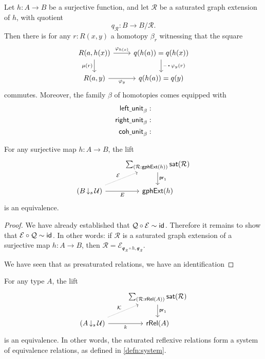 \begin{cor}
Let $h:A\to B$ be a surjective function, and let $\mathcal{R}$ be a saturated graph extension of $h$, with quotient
\begin{equation*}
q_{\mathcal{R}}:B\to B/\mathcal{R}.
\end{equation*}
Then there is for any $r:R(x,y)$ a homotopy $\beta_r$ witnessing that the square
\begin{equation*}
\begin{tikzcd}
R(a,h(x)) \arrow[d,swap,"\mu(r)"] \arrow[r,"\varphi_{h(x)}"] & q(h(a))=q(h(x)) \arrow[d,"\ct{\blank}{\varphi_y(r)}"] \\
R(a,y) \arrow[r,swap,"\varphi_y"] & q(h(a))=q(y)
\end{tikzcd}
\end{equation*}
commutes. Moreover, the family $\beta$ of homotopies comes equipped with
\begin{align*}
\mathsf{left\underline{\ }{}unit}_\beta & : \\
\mathsf{right\underline{\ }{}unit}_\beta & : \\
\mathsf{coh\underline{\ }{}unit}_\beta & : 
\end{align*}
\end{cor}

\begin{thm}
For any surjective map $h:A\to B$, the lift
\begin{equation*}
\begin{tikzcd}
& \sm{\mathcal{R}:\mathsf{gphExt}(h)}\mathsf{sat}(\mathcal{R}) \arrow[d,"\proj 1"] \\
(B\,{\downarrow_s}\,\UU) \arrow[r,swap,"E"] \arrow[ur,densely dotted,"\mathcal{E}"] & \mathsf{gphExt}(h)
\end{tikzcd}
\end{equation*}
is an equivalence.
\end{thm}

\begin{proof}
We have already established that $\mathcal{Q}\circ\mathcal{E}\sim \mathsf{id}_{}$. Therefore it remains to show that $\mathcal{E}\circ \mathcal{Q}\sim\mathsf{id}_{}$. In other words: if $\mathcal{R}$ is a saturated graph extension of a surjective map $h:A\to B$, then $\mathcal{R}=\mathcal{E}_{\mathcal{q}_{\mathcal{R}}\circ h,\mathcal{q}_{\mathcal{R}}}$. 

We have seen that as presaturated relations, we have an identification
\end{proof}

\begin{cor}
For any type $A$, the lift
\begin{equation*}
\begin{tikzcd}
& \sm{\mathcal{R}:\mathsf{rRel}(A)}\mathsf{sat}(\mathcal{R}) \arrow[d,"\proj 1"] \\
(A\,{\downarrow_s}\,\UU) \arrow[r,swap,"k"] \arrow[ur,densely dotted,"\mathcal{K}"] & \mathsf{rRel}(A)
\end{tikzcd}
\end{equation*}
is an equivalence. In other words, the saturated reflexive relations form a system of equivalence relations, as defined in \cref{defn:system}.
\end{cor}

